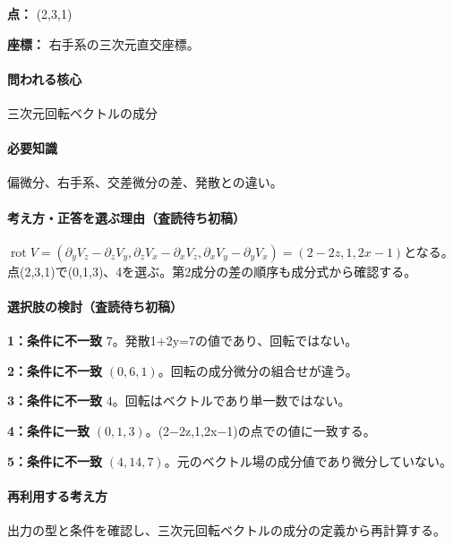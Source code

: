 \noindent\textbf{点：} (2,3,1)\par

\noindent\textbf{座標：} 右手系の三次元直交座標。\par

\paragraph{問われる核心} 三次元回転ベクトルの成分

\paragraph{必要知識} 偏微分、右手系、交差微分の差、発散との違い。

\paragraph{考え方・正答を選ぶ理由（査読待ち初稿）} \(\operatorname{rot}V=(\partial_yV_z-\partial_zV_y,\partial_zV_x-\partial_xV_z,\partial_xV_y-\partial_yV_x)=(2-2z,1,2x-1)\)となる。点(2,3,1)で(0,1,3)、4を選ぶ。第2成分の差の順序も成分式から確認する。

\paragraph{選択肢の検討（査読待ち初稿）}\mbox{}\par

\noindent\textbf{1：条件に不一致} \(7\)。発散1+2y=\allowbreak{}7の値であり、回転ではない。\par

\noindent\textbf{2：条件に不一致} \((0,6,1)\)。回転の成分微分の組合せが違う。\par

\noindent\textbf{3：条件に不一致} \(4\)。回転はベクトルであり単一数ではない。\par

\noindent\textbf{4：条件に一致} \((0,1,3)\)。(2−2z,1,2x−1)の点での値に一致する。\par

\noindent\textbf{5：条件に不一致} \((4,14,7)\)。元のベクトル場の成分値であり微分していない。\par

\paragraph{再利用する考え方} 出力の型と条件を確認し、三次元回転ベクトルの成分の定義から再計算する。

